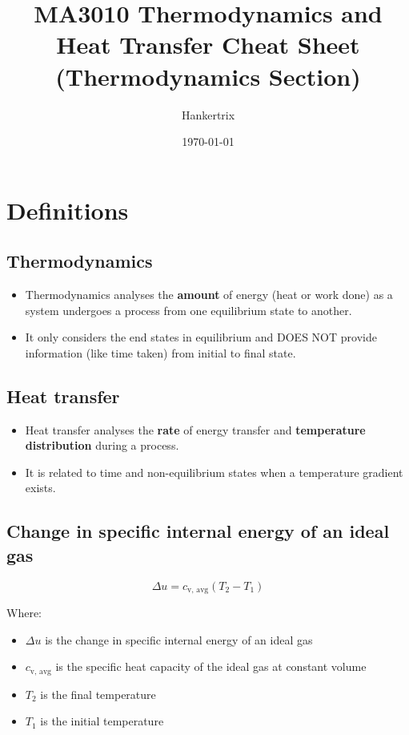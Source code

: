 \documentclass[11pt]{article}
\author{Hankertrix}
\date{\today}
\title{MA3010 Thermodynamics and Heat Transfer Cheat Sheet (Thermodynamics Section)}
\begin{document}
\maketitle
\setcounter{tocdepth}{2}
\tableofcontents \clearpage
\section{Definitions}
\label{sec:orgf0c7d8e}

\subsection{Thermodynamics}
\label{sec:orgdb883b3}
\begin{itemize}
\item Thermodynamics analyses the \textbf{amount} of energy (heat or work done) as a system undergoes a process from one equilibrium state to another.
\item It only considers the end states in equilibrium and DOES NOT provide information (like time taken) from initial to final state.
\end{itemize}

\subsection{Heat transfer}
\label{sec:org6e13ab1}
\begin{itemize}
\item Heat transfer analyses the \textbf{rate} of energy transfer and \textbf{temperature distribution} during a process.
\item It is related to time and non-equilibrium states when a temperature gradient exists.
\end{itemize}

\subsection{Change in specific internal energy of an ideal gas}
\label{sec:org89c2fc9}
\[\Delta u = c_{\text{v, avg}} (T_2 - T_1)\]

Where:
\begin{itemize}
\item \(\Delta u\) is the change in specific internal energy of an ideal gas
\item \(c_{\text{v, avg}}\) is the specific heat capacity of the ideal gas at constant volume
\item \(T_2\) is the final temperature
\item \(T_1\) is the initial temperature
\end{itemize}
\end{document}
